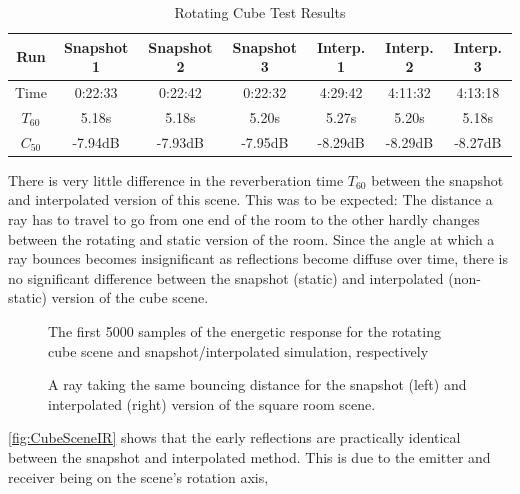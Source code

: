 \begin{table}[t!]
    \centering
    \begin{tabular}{| c | c | c | c | c | c | c |}
        \hline
        Run        & Snapshot 1 & Snapshot 2 & Snapshot 3 & Interp. 1 & Interp. 2 & Interp. 3 \\
        \hline
        Time       & 0:22:33    & 0:22:42    & 0:22:32    & 4:29:42   & 4:11:32   & 4:13:18   \\
        \hline
        \(T_{60}\) & 5.18s      & 5.18s      & 5.20s      & 5.27s     & 5.20s     & 5.18s     \\
        \hline
        \(C_{50}\) & -7.94dB    & -7.93dB    & -7.95dB    & -8.29dB   & -8.29dB   & -8.27dB   \\
        \hline
    \end{tabular}
    \caption{Rotating Cube Test Results}\label{tbl:CubeSceneTable}
\end{table}
There is very little difference in the reverberation time \(T_{60}\) between the snapshot and interpolated version of this scene.
This was to be expected:
The distance a ray has to travel to go from one end of the room to the other hardly changes between the rotating and static version of the room.
Since the angle at which a ray bounces becomes insignificant as reflections become diffuse over time,
there is no significant difference between the snapshot (static) and interpolated (non-static) version of the cube scene.
\newline
\begin{figure}[t!]
    \begin{center}
        
    \end{center}
    \caption{The first 5000 samples of the energetic response for the rotating cube scene and snapshot/interpolated simulation, respectively}\label{fig:CubeSceneIR}
\end{figure}
\begin{figure}[t!]
    \begin{center}
        
    \end{center}
    \caption{A ray taking the same bouncing distance for the snapshot (left) and interpolated (right) version of the square room scene.}\label{fig:CubeRotation}
\end{figure}
\autoref{fig:CubeSceneIR} shows that the early reflections are practically identical between the snapshot and interpolated method.
This is due to the emitter and receiver being on the scene's rotation axis,
